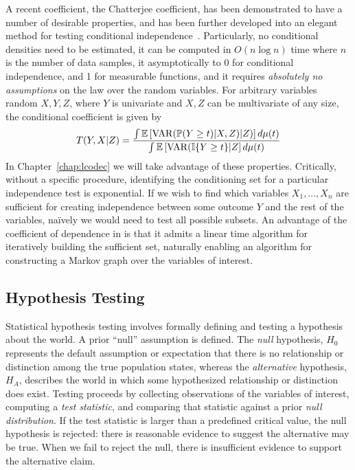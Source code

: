 A recent coefficient, the Chatterjee coefficient, has been demonstrated to have a number of desirable properties, and has been further developed into an elegant method for testing conditional independence~\citep{chatterjee2020new,codec}. 
Particularly,
no conditional densities need to be estimated,
it can be computed in $O(n\log n)$ time where $n$ is the number of data samples,
it asymptotically to 0 for conditional independence, and 1 for measurable functions,
and it requires \textit{absolutely no assumptions} on the law over the random variables.
For arbitrary variables random $X,Y,Z$, where $Y$ is univariate and $X,Z$ can be multivariate of any size, the conditional coefficient is given  by
\begin{align}\label{eq:contcodec}
    T(Y,X|Z) = \frac{\int\mathbb{E}\left[\operatorname*{VAR}(\mathbb{P}(Y\geq t)|X,Z)|Z)\right]d\mu(t)}{\int\mathbb{E}\left[\operatorname*{VAR}(\mathbb{I}\{Y\geq t\}|Z\right] d\mu(t)}
\end{align}
In Chapter~\ref{chap:lcodec} we will take advantage of these properties. Critically, without a specific procedure, identifying the conditioning set for a particular independence test is exponential. If we wish to find which variables $X_1,\ldots,X_n$ are sufficient for creating independence between some outcome $Y$ and the rest of the variables, na\"ively we would need to test all possible subsets.
An advantage of the coefficient of dependence in \cite{codec} is that it admits a linear time algorithm for iteratively building the sufficient set, naturally enabling an algorithm for constructing a Markov graph over the variables of interest.

\subsection{Hypothesis Testing}

Statistical hypothesis testing involves formally defining and testing a hypothesis about the world.
A prior ``null'' assumption is defined. The \textit{null} hypothesis, $H_0$
represents the default assumption or expectation
that there is no relationship or distinction among
the true population states,
whereas the \textit{alternative} hypothesis, $H_A$,
describes the world in which some hypothesized 
relationship or distinction does exist.
Testing proceeds by collecting observations
of the variables of interest,
computing a \textit{test statistic},
and comparing that statistic against
a prior \textit{null distribution}.
If the test statistic is larger
than a predefined critical value,
the null hypothesis is rejected:
there is reasonable evidence to suggest
the alternative may be true.
When we fail to reject the null,
there is insufficient evidence to support
the alternative claim.

